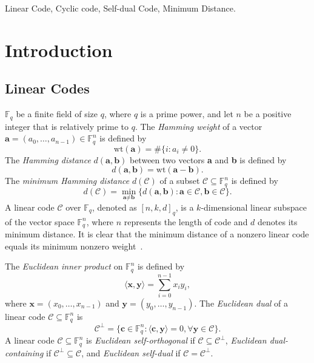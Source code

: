 \documentclass[journal,12pt,onecolumn]{IEEEtran}
\begin{document}
\begin{IEEEkeywords}
Linear Code, Cyclic code, Self-dual Code, Minimum Distance.
\end{IEEEkeywords}

\section{Introduction}
\label{1}
\subsection{Linear Codes}
 $\mathbb{F}_q$ be a finite field of size $q$, where $q$ is a prime power, and let $n$ be a positive integer that is relatively prime to $q$. The \textit{Hamming weight} of a vector $\textbf{a}=(a_0,\dots,a_{n-1})\in \mathbb{F}_q^n$ is defined by 
\[\text{wt}(\textbf{a})=\#\{i:a_i\ne0\}.\] The \textit{Hamming distance} $d(\textbf{a},\textbf{b})$ between two vectors \textbf{a} and \textbf{b} is defined by 
\[d(\textbf{a},\textbf{b})=\text{wt}(\textbf{a}-\textbf{b}).\]
The \textit{minimum Hamming distance} $d(\mathcal{C})$ of a subset $\mathcal{C}\subseteq \mathbb{F}_q^n$ is defined by \[d(\mathcal{C})=\min\limits_{\textbf{a}\ne\textbf{b}}\{d(\textbf{a},\textbf{b}):\textbf{a}\in \mathcal{C},\textbf{b}\in\mathcal{C}\}.\]
A linear code $\mathcal{C}$ over $\mathbb{F}_q$, denoted as $[n,k,d]_q$, is a $k$-dimensional linear subspace of the vector space $\mathbb{F}_q^n$, where $n$ represents the length of code and $d$ denotes its minimum distance. It is clear that the minimum distance of a nonzero linear code equals its minimum nonzero weight~\cite{Blahut2003Algebraic}.

The \textit{Euclidean inner product} on $\mathbb{F}_q^n$ is defined by \[\langle\textbf{x},\textbf{y}\rangle=\sum\limits_{i=0}^{n-1}x_iy_i,\]
where $\textbf{x}=(x_0,\dots,x_{n-1})$ and $\textbf{y}=(y_0,\dots,y_{n-1})$. The \textit{Euclidean dual} of a linear code $\mathcal{C}\subseteq\mathbb{F}_q^n$ is \[\mathcal{C}^\perp=\{\textbf{c}\in \mathbb{F}_q^n:\langle\textbf{c},\textbf{y}\rangle=0,\forall\textbf{y}\in \mathcal{C}\}.\]
A linear code $\mathcal{C}\subseteq\mathbb{F}_q^n$ is \textit{Euclidean self-orthogonal} if $\mathcal{C}\subseteq \mathcal{C}^\perp$, \textit{Euclidean dual-containing} if $\mathcal{C}^\perp\subseteq\mathcal{C}$, and \textit{Euclidean self-dual} if $\mathcal{C}=\mathcal{C}^\perp$.
\end{document}
